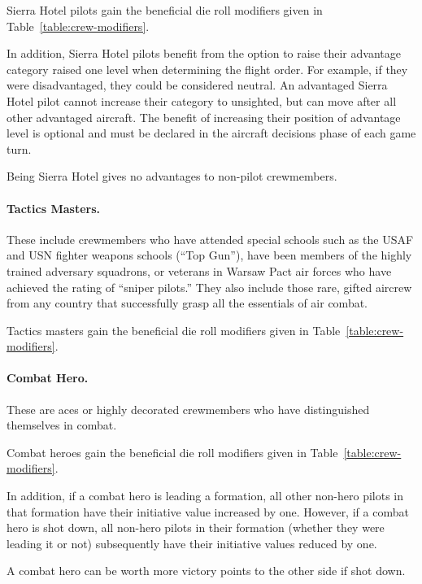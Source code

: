 \begin{advancedrules}
{Sierra Hotel pilots gain the beneficial die roll modifiers given in Table~\ref{table:crew-modifiers}.

In addition, Sierra Hotel pilots benefit from the option to raise their advantage category raised one level when determining the flight order. For example, if they were disadvantaged, they could be considered neutral. An advantaged Sierra Hotel pilot cannot increase their category to unsighted, but can move after all other advantaged aircraft. The benefit of increasing their position of advantage level is optional and must be declared in the aircraft decisions phase of each game turn.

Being Sierra Hotel gives no advantages to non-pilot crewmembers.

\paragraph{Tactics Masters.} These include crewmembers who have attended special schools such as the USAF and USN fighter weapons schools (“Top Gun”), have been members of the highly trained adversary squadrons, or veterans in Warsaw Pact air forces who have achieved the rating of “sniper pilots.” They also include those rare, gifted aircrew from any country that successfully grasp all the essentials of air combat.

Tactics masters gain the beneficial die roll modifiers given in Table~\ref{table:crew-modifiers}.

\paragraph{Combat Hero.} These are aces or highly decorated crewmembers who have distinguished themselves in combat.

Combat heroes gain the beneficial die roll modifiers given in Table~\ref{table:crew-modifiers}.

In addition, if a combat hero is leading a formation, all other non-hero pilots in that formation have their initiative value increased by one. However, if a combat hero is shot down, all non-hero pilots in their formation (whether they were leading it or not) subsequently have their initiative values reduced by one.

A combat hero can be worth more victory points to the other side if shot down. 

}

\end{advancedrules}
